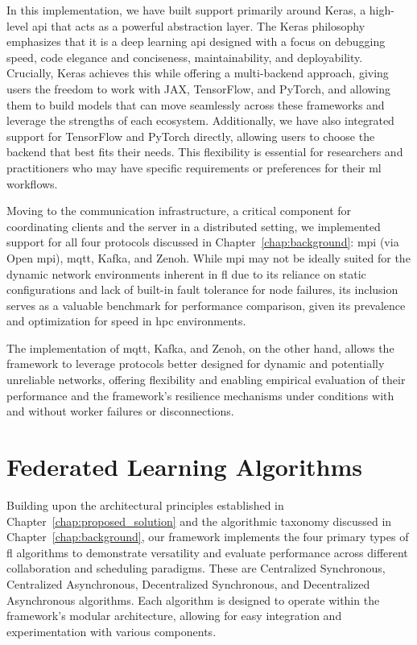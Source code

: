 In this implementation, we have built support primarily around Keras, a high-level \ac{api} that acts as a powerful abstraction layer. The Keras philosophy emphasizes that it is a deep learning \ac{api} designed with a focus on debugging speed, code elegance and conciseness, maintainability, and deployability. Crucially, Keras achieves this while offering a multi-backend approach, giving users the freedom to work with JAX, TensorFlow, and PyTorch, and allowing them to build models that can move seamlessly across these frameworks and leverage the strengths of each ecosystem. Additionally, we have also integrated support for TensorFlow and PyTorch directly, allowing users to choose the backend that best fits their needs. This flexibility is essential for researchers and practitioners who may have specific requirements or preferences for their \ac{ml} workflows.

Moving to the communication infrastructure, a critical component for coordinating clients and the server in a distributed setting, we implemented support for all four protocols discussed in Chapter~\ref{chap:background}: \ac{mpi} (via Open \ac{mpi}), \ac{mqtt}, Kafka, and Zenoh. While \ac{mpi} may not be ideally suited for the dynamic network environments inherent in \ac{fl} due to its reliance on static configurations and lack of built-in fault tolerance for node failures, its inclusion serves as a valuable benchmark for performance comparison, given its prevalence and optimization for speed in \ac{hpc} environments. 

The implementation of \ac{mqtt}, Kafka, and Zenoh, on the other hand, allows the framework to leverage protocols better designed for dynamic and potentially unreliable networks, offering flexibility and enabling empirical evaluation of their performance and the framework's resilience mechanisms under conditions with and without worker failures or disconnections.



\section{Federated Learning Algorithms}
\label{sec:federated-learning-algorithms}

Building upon the architectural principles established in Chapter~\ref{chap:proposed_solution} and the algorithmic taxonomy discussed in Chapter~\ref{chap:background}, our framework implements the four primary types of \ac{fl} algorithms to demonstrate versatility and evaluate performance across different collaboration and scheduling paradigms. These are Centralized Synchronous, Centralized Asynchronous, Decentralized Synchronous, and Decentralized Asynchronous algorithms. Each algorithm is designed to operate within the framework's modular architecture, allowing for easy integration and experimentation with various components.

